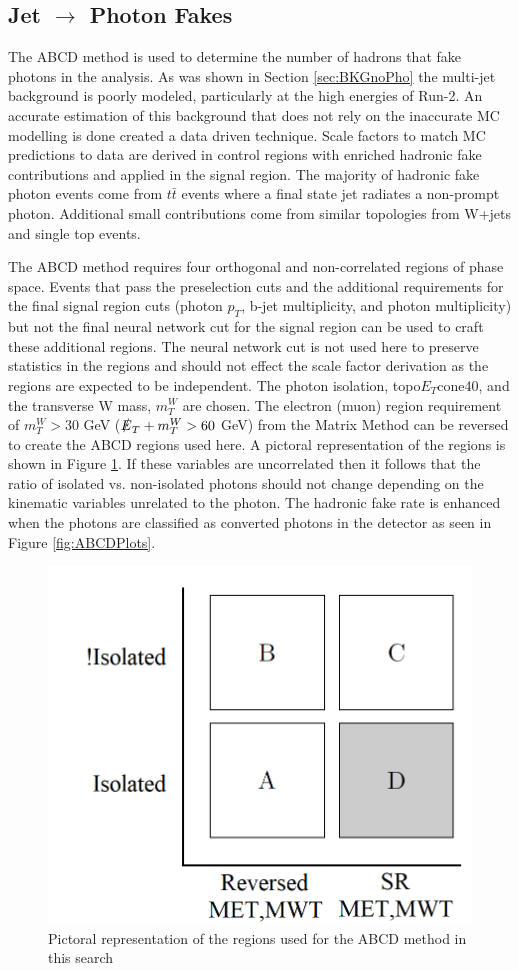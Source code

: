 \subsection{Jet $\rightarrow$ Photon Fakes}
\label{sec:FakePho2}

The ABCD method is used to determine the number of hadrons that fake photons in the analysis.  As was shown in Section \ref{sec:BKGnoPho} the multi-jet background is poorly modeled, particularly at the high energies of Run-2.  An accurate estimation of this background that does not rely on the inaccurate MC modelling is done created a data driven technique.  Scale factors to match MC predictions to data are derived in control regions with enriched hadronic fake contributions and applied in the signal region.  The majority of hadronic fake photon events come from $t\bar{t}$ events where a final state jet radiates a non-prompt photon.  Additional small contributions come from similar topologies from W+jets and single top events.  

The ABCD method requires four orthogonal and non-correlated regions of phase space.  Events that pass the preselection cuts and the additional requirements for the final signal region cuts (photon $p_T$, b-jet multiplicity, and photon multiplicity) but not the final neural network cut for the signal region can be used to craft these additional regions.  The neural network cut is not used here to preserve statistics in the regions and should not effect the scale factor derivation as the regions are expected to be independent.  The photon isolation,  topo$E_{T}$cone40, and the transverse W mass, $m_T^W$ are chosen.  The electron (muon) region requirement of $m_T^W > 30$ GeV ($\slashed{E}_T + m_T^W > 60$ GeV) from the Matrix Method can be reversed to create the ABCD regions used here.  A pictoral representation of the regions is shown in Figure \ref{fig:ABCD}.  If these variables are uncorrelated then it follows that the ratio of isolated vs. non-isolated photons should not change depending on the kinematic variables unrelated to the photon.  The hadronic fake rate is enhanced when the photons are classified as converted photons in the detector as seen in Figure \ref{fig:ABCDPlots}.

\begin{figure}[h!]
	\centering
	\includegraphics[width=.5\columnwidth]{../ThesisImages/SearchStrategy/ABCDpictoral.png}
	\caption{Pictoral representation of the regions used for the ABCD method in this search}
	\label{fig:ABCD}
\end{figure}

